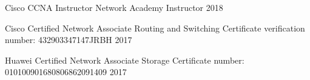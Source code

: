 

\begin{cvcertifications}

	\cvcertification
		{Cisco CCNA Instructor} %
		{Network Academy Instructor} %
		{2018} %
		
	\cvcertification
		{Cisco Certified Network Associate Routing and Switching} %
		{Certificate verification number: 432903347147JRBH} %
		{2017} %
\end{cvcertifications}



\begin{cvcertifications}
	
	\cvcertification
		{Huawei Certified Network Associate Storage} %
		{Certificate number: 010100901680806862091409} %
		{2017} %
	
\end{cvcertifications}